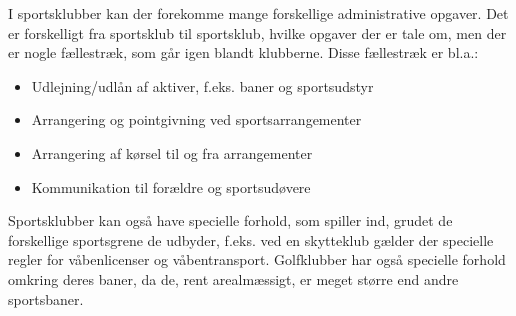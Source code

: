 I sportsklubber kan der forekomme mange forskellige administrative opgaver. 
Det er forskelligt fra sportsklub til sportsklub, hvilke opgaver der er tale om, men der er nogle fællestræk, som går igen blandt klubberne. 
Disse fællestræk er bl.a.:
\begin{itemize}
	\item Udlejning/udlån af aktiver, f.eks. baner og sportsudstyr 
	\item Arrangering og pointgivning ved sportsarrangementer
	\item Arrangering af kørsel til og fra arrangementer
	\item Kommunikation til forældre og sportsudøvere
\end{itemize}

Sportsklubber kan også have specielle forhold, som spiller ind, grudet de forskellige sportsgrene de udbyder, f.eks. ved en skytteklub gælder der specielle regler for våbenlicenser og våbentransport.
Golfklubber har også specielle forhold omkring deres baner, da de, rent arealmæssigt, er meget større end andre sportsbaner. 








